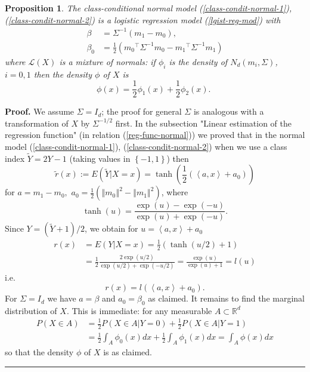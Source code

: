 \documentclass[11pt,twoside]{article}%
\theoremstyle{change}
\newtheorem{proposition}[theorem]{Proposition}
\newenvironment{proof}[1][Proof]{\textbf{#1.} }{\ \rule{0.5em}{0.5em}}
\begin{document}
\begin{proposition}
\label{prop-logistic-is true-if-normal}The class-conditional normal model
(\ref{class-condit-normal-1}), (\ref{class-condit-normal-2}) is a logistic
regression model (\ref{lgist-reg-mod}) with
\begin{align*}
\beta & =\Sigma^{-1}\left(  m_{1}-m_{0}\right)  ,\\
\beta_{0}  & =\frac{1}{2}\left(  m_{0}{}^{\top}\Sigma^{-1}m_{0}-m_{1}{}^{\top
}\Sigma^{-1}m_{1}\right)
\end{align*}
where $\mathcal{L}\left(  X\right)  $ is a mixture of normals: if $\phi_{i}$
is the density of $N_{d}\left(  m_{i},\Sigma\right)  $, $i=0,1$ then the
density $\phi$ of $X$ is
\[
\phi(x)=\frac{1}{2}\phi_{1}(x)+\frac{1}{2}\phi_{2}(x)\text{. }%
\]

\end{proposition}

\begin{proof}
We assume $\Sigma=I_{d}$; the proof for general $\Sigma$ is analogous with a
transformation of $X$ by $\Sigma^{-1/2}$ first. In the subsection "Linear
estimation of the regression function" (in relation (\ref{reg-func-normal}))
we proved that in the normal model (\ref{class-condit-normal-1}),
(\ref{class-condit-normal-2}) when we use a class index $\tilde{Y}=2Y-1$
(taking values in $\left\{  -1,1\right\}  $) then
\[
\tilde{r}(x):=E\left(  \tilde{Y}|X=x\right)  =\tanh\left(  \frac{1}{2}\left(
\left\langle a,x\right\rangle +a_{0}\right)  \right)
\]
for $a=m_{1}-m_{0},$ $a_{0}=\frac{1}{2}\left(  \left\Vert m_{0}\right\Vert
^{2}-\left\Vert m_{1}\right\Vert ^{2}\right)  $, where
\[
\tanh\left(  u\right)  =\frac{\exp\left(  u\right)  -\exp\left(  -u\right)
}{\exp\left(  u\right)  +\exp\left(  -u\right)  }.
\]
Since $Y=\left(  \tilde{Y}+1\right)  /2$, we obtain for $u=\left\langle
a,x\right\rangle +a_{0}$
\begin{align*}
r(x)  & =E\left(  Y|X=x\right)  =\frac{1}{2}\left(  \tanh\left(  u/2\right)
+1\right) \\
& =\frac{1}{2}\frac{2\exp\left(  u/2\right)  }{\exp\left(  u/2\right)
+\exp\left(  -u/2\right)  }=\frac{\exp\left(  u\right)  }{\exp\left(
u\right)  +1}=l(u)
\end{align*}
i.e.
\[
r(x)=l(\left\langle a,x\right\rangle +a_{0}).
\]
For $\Sigma=I_{d}$ we have $a=\beta$ and $a_{0}=\beta_{0}$ as claimed. It
remains to find the marginal distribution of $X$. This is immediate: for any
measurable $A\subset\mathbb{R}^{d}$
\begin{align*}
P\left(  X\in A\right)   & =\frac{1}{2}P\left(  X\in A|Y=0\right)  +\frac
{1}{2}P\left(  X\in A|Y=1\right) \\
& =\frac{1}{2}\int_{A}\phi_{0}(x)dx+\frac{1}{2}\int_{A}\phi_{1}(x)dx=\int
_{A}\phi(x)dx
\end{align*}
so that the density $\phi$ of $X$ is as claimed.
\end{proof}
\end{document}
